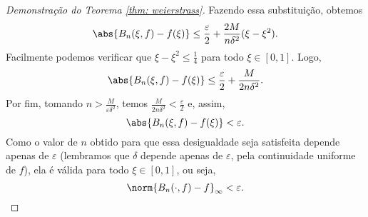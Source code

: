 \begin{proof}[Demonstração do Teorema \ref{thm: weierstrass}]
    Fazendo essa substituição, obtemos
    \begin{equation}
        \abs{ B_{ n } (\xi, f) - f(\xi) } \leq
        \frac{ \varepsilon }{ 2 } 
        + \frac{ 2M }{ n \delta^2 } ( \xi - \xi^2 )
    .\end{equation}
    Facilmente podemos verificar que \( \xi - \xi^2 \leq \frac{ 1 }{ 4 } \) para todo \( \xi \in [0, 1] \).
    Logo,
    \begin{equation}
        \abs{ B_{ n } (\xi, f) - f(\xi) } \leq
        \frac{ \varepsilon }{ 2 } 
        + \frac{ M }{ 2 n \delta^2 }
    .\end{equation}
    Por fim, tomando \( n > \frac{ M }{ \varepsilon \delta^2 } \), temos \( \frac{ M }{ 2 n \delta^2 } < \frac{ \varepsilon }{ 2 } \) e, assim,
    \begin{equation}
        \abs{ B_{ n } (\xi, f) - f(\xi) } < \varepsilon
    .\end{equation}
    Como o valor de \( n \) obtido para que essa desigualdade seja satisfeita depende apenas de \( \varepsilon \) (lembramos que \( \delta \) depende apenas de \( \varepsilon \), pela continuidade uniforme de \( f \)), ela é válida para todo \( \xi \in [0, 1] \), ou seja, \[
        \norm{ B_{ n } (\cdot , f) - f }_{ \infty } < \varepsilon
    .\qedhere\]
 \end{proof}
 

